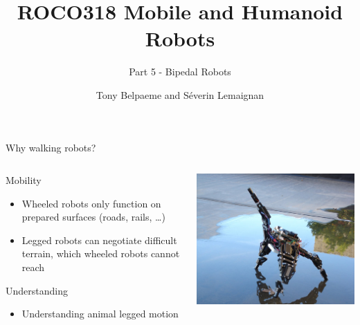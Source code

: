 \documentclass[compress]{beamer}
\title{ROCO318 \newline Mobile and Humanoid Robots}
\subtitle{Part 5 - Bipedal Robots}
\date{}
\author{Tony Belpaeme and Séverin Lemaignan}
\institute{Centre for Neural Systems and Robotics\\{\bf Plymouth University}}
\begin{document}

\maketitle


\begin{frame}{Why walking robots?}
    \begin{columns}
        \begin{column}{0.5\linewidth}
    Mobility

    \begin{itemize}

        \item Wheeled robots only function on prepared surfaces (roads, rails, \ldots{})
        \item Legged robots can negotiate difficult terrain, which wheeled robots
            cannot reach
    \end{itemize}

    Understanding

    \begin{itemize}

        \item Understanding animal legged motion
    \end{itemize}
            
        \end{column}
        \begin{column}{0.5\linewidth}
            \begin{center}
                \includegraphics[width=0.8\linewidth]{image1}


\end{center}
\end{column}
\end{columns}
\end{frame}
\end{document}
